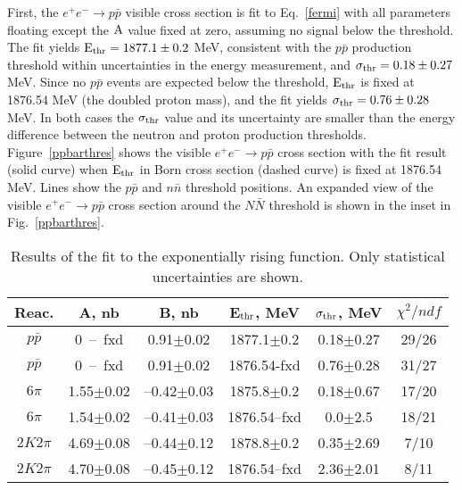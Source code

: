 \documentclass[12pt]{elsarticle}
\def\epem {\ensuremath{e^+ e^-}}
\def\ppbar {\ensuremath{p\bar p}}
\def\nnbar {\ensuremath{n\bar n}}
\def\NNbar {\ensuremath{N\bar N}}
\begin{document}
 First, the $\epem\to\ppbar$ visible cross section is fit to Eq.~\ref{fermi} with all parameters floating 
except the $\rm A$ value fixed at zero, assuming no signal below the threshold.
The fit yields $\rm E_{\rm thr} = 1877.1\pm0.2$ MeV, 
consistent with the $\ppbar$  production threshold within  
uncertainties in the energy measurement, and  
$\rm \sigma_{\rm thr} = 0.18 \pm 0.27$ MeV.
Since no $\ppbar$ events are expected below the threshold,  
$\rm E_{\rm thr}$ is fixed at 1876.54 MeV (the 
doubled proton mass), and the fit yields $\rm \sigma_{\rm thr} = 0.76 \pm 0.28$ 
MeV. In both cases the $\rm \sigma_{\rm thr}$ value and its uncertainty are 
smaller than the 
energy difference between the neutron and proton production thresholds.
Figure~\ref{ppbarthres}
shows the visible $\epem\to\ppbar$ cross section with the fit result (solid curve) when  $\rm E_{\rm thr}$ in Born cross section (dashed curve) is fixed at 1876.54 MeV.
Lines show the $\ppbar$ and $\nnbar$
threshold positions. An expanded view of the visible $\epem\to\ppbar$
cross section around the $\NNbar$ threshold is shown in the inset in 
Fig.~\ref{ppbarthres}.

\begin{table}
\caption{Results of the fit to the exponentially rising function. Only statistical uncertainties are shown.}
\label{tab}
\begin{tabular}{|c|c|c|c|c|c|}
\hline
Reac. & A, nb & B, nb & E$_{\rm thr}$, MeV &  $\rm \sigma_{\rm
  thr}$, MeV & $\chi^2/ndf $ \\
\hline
\ppbar & 0~--~fxd & 0.91$\pm$0.02 & 1877.1$\pm$0.2 &
                                                      0.18$\pm$0.27&29/26\\
\ppbar & 0~--~fxd & 0.91$\pm$0.02 & 1876.54-fxd &
                                                      0.76$\pm$0.28&31/27 \\
$6\pi$ &1.55$\pm$0.02&--0.42$\pm$0.03&1875.8$\pm$0.2&0.18$\pm$0.67&17/20\\ 

$6\pi$ &1.54$\pm$0.02&--0.41$\pm$0.03&1876.54--fxd&0.0$\pm$2.5&18/21\\

$2K2\pi$ &4.69$\pm$0.08&--0.44$\pm$0.12&1878.8$\pm$0.2&0.35$\pm$2.69&7/10\\ 

$2K2\pi$ &4.70$\pm$0.08&--0.45$\pm$0.12&1876.54--fxd&2.36$\pm$2.01&8/11\\
\hline
\end{tabular}
\end{table}
\end{document}
